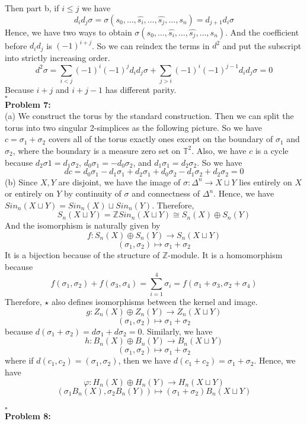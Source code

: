 \documentclass[12pt]{amsart}
\newcommand{\Z}{\mathbb{Z}}
\newcommand{\torus}{\mathbb{T}^2}
\begin{document}
Then part b, if $i\leq j$ we have 
\[d_id_j\sigma=\sigma(s_0,\dots, \hat{s_i},\dots,\hat{s_{j}},\dots,s_n)=d_{j+1}d_i\sigma\]
Hence, we have two ways to obtain $\sigma(s_0,\dots, \hat{s_i},\dots,\hat{s_{j}},\dots,s_n)$. And the coefficient before $d_id_j$ is $(-1)^{i+j}$. So we can reindex the terms in $d^2$ and put the subscript into strictly increasing order.
\[d^2\sigma=\sum_{i<j}(-1)^i(-1)^jd_id_j\sigma+\sum_{j>i}(-1)^i(-1)^{j-1}d_id_j\sigma=0\]
Because $i+j$ and $i+j-1$ has different parity.
\\\phantom{qed}\hfill$\square$\\
\textbf{Problem 7:}\\
(a) We construct the torus by the standard construction. Then we can split the torus into two singular 2-simplices as the following picture. So we have $c=\sigma_1+\sigma_2$ covers all of the torus exactly ones except on the boundary of $\sigma_1$ and $\sigma_2$, where the boundary is a measure zero set on $\torus$. Also, we have $c$ is a cycle because $d_2\sigma 1 =d_1\sigma_2$, $d_0\sigma_1=-d_0\sigma_2$, and $d_1\sigma_1=d_2\sigma_2$. So we have
\[dc=d_0\sigma_1-d_1\sigma_1+d_2\sigma_1+d_0\sigma_2-d_1\sigma_2+d_2\sigma_2=0\]
(b) Since $X,Y$ are disjoint, we have the image of $\sigma:\Delta^n\to X\sqcup Y$ lies entirely on $X$ or entirely on $Y$ by continuity of $\sigma$ and connectness of $\Delta^n$. Hence, we have $Sin_n(X\sqcup Y)=Sin_n(X)\sqcup Sin_n(Y)$. Therefore,
\[S_n(X\sqcup Y)=\Z Sin_n(X\sqcup Y)\cong S_n(X)\oplus S_n(Y)\]
And the isomorphism is naturally given by 
\[f:S_n(X)\oplus S_n(Y)\to S_n(X\sqcup Y)\]
\[(\sigma_1,\sigma_2)\mapsto \sigma_1+\sigma_2\tag{$\star$}\]
It is a bijection because of the structure of $\Z$-module. It is a homomorphism because 
\[f(\sigma_1,\sigma_2)+f(\sigma_3,\sigma_4)=\sum_{i=1}^4\sigma_i=f(\sigma_1+\sigma_3,\sigma_2+\sigma_4)\]
Therefore, $\star$ also defines isomorphisms between the kernel and image.
\[g:Z_n(X)\oplus Z_n(Y)\to Z_n(X\sqcup Y)\]
\[(\sigma_1,\sigma_2)\mapsto \sigma_1+\sigma_2\]
because $d(\sigma_1+\sigma_2)=d\sigma_1+d\sigma_2=0$. Similarly, we have 
\[h:B_n(X)\oplus B_n(Y)\to B_n(X\sqcup Y)\]
\[(\sigma_1,\sigma_2)\mapsto \sigma_1+\sigma_2\]
where if $d(c_1,c_2)=(\sigma_1,\sigma_2)$, then we have $d(c_1+c_2)=\sigma_1+\sigma_2$.
Hence, we have 
\[\varphi: H_n(X)\oplus H_n(Y)\to H_n(X\sqcup Y)\]
\[(\sigma_1 B_n(X),\sigma_2 B_n(Y))\mapsto (\sigma_1+\sigma_2)B_n(X\sqcup Y)\]
\\\phantom{qed}\hfill$\square$\\
\textbf{Problem 8:}\\
\end{document}
